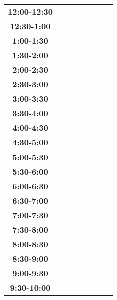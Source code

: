 \documentclass{article}
\begin{document}
\begin{table}[ht]
\begin{tabular}{|c|c|c|c|c|c|c|c|}
\cline{1-8} 
\rowcolor{backgroundcolor}\textbf{12:00-12:30} &   &   &   &   &   &   &   \\
\cline{1-8} 
\rowcolor{backgroundcolor}\textbf{12:30-1:00} &   &   &   &   &   &   &   \\
\cline{1-8} 
\rowcolor{backgroundcolor}\textbf{1:00-1:30} &   &   &   &   &   &   &   \\
\cline{1-8} 
\rowcolor{backgroundcolor}\textbf{1:30-2:00} &   &   &   &   &   &   &   \\
\cline{1-8} 
\rowcolor{backgroundcolor}\textbf{2:00-2:30} &   &   &   &   &   &   &   \\
\cline{1-8} 
\rowcolor{backgroundcolor}\textbf{2:30-3:00} &   &   &   &   &   &   &   \\
\cline{1-8} 
\rowcolor{backgroundcolor}\textbf{3:00-3:30} &   &   &   &   &   &   &   \\
\cline{1-8} 
\rowcolor{backgroundcolor}\textbf{3:30-4:00} &   &   &   &   &   &   &   \\
\cline{1-8} 
\rowcolor{backgroundcolor}\textbf{4:00-4:30} &   &   &   &   &   &   &   \\
\cline{1-8} 
\rowcolor{backgroundcolor}\textbf{4:30-5:00} &   &   &   &   &   &   &   \\
\cline{1-8} 
\rowcolor{backgroundcolor}\textbf{5:00-5:30} &   &   &   &   &   &   &   \\
\cline{1-8} 
\rowcolor{backgroundcolor}\textbf{5:30-6:00} &   &   &   &   &   &   &   \\
\cline{1-8} 
\rowcolor{backgroundcolor}\textbf{6:00-6:30} &   &   &   &   &   &   &   \\
\cline{1-8} 
\rowcolor{backgroundcolor}\textbf{6:30-7:00} &   &   &   &   &   &   &   \\
\cline{1-8} 
\rowcolor{backgroundcolor}\textbf{7:00-7:30} &   &   &   &   &   &   &   \\
\cline{1-8} 
\rowcolor{backgroundcolor}\textbf{7:30-8:00} &   &   &   &   &   &   &   \\
\cline{1-8} 
\rowcolor{backgroundcolor}\textbf{8:00-8:30} &   &   &   &   &   &   &   \\
\cline{1-8} 
\rowcolor{backgroundcolor}\textbf{8:30-9:00} &   &   &   &   &   &   &   \\
\cline{1-8} 
\rowcolor{backgroundcolor}\textbf{9:00-9:30} &   &   &   &   &   &   &   \\
\cline{1-8} 
\rowcolor{backgroundcolor}\textbf{9:30-10:00} &   &   &   &   &   &   &   \\
\cline{1-8} 
\end{tabular}
\end{table}
\end{document}
